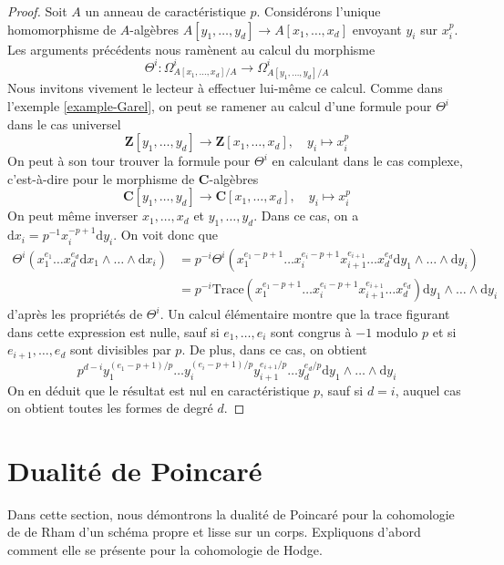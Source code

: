 \begin{proof}
\medskip\noindent
Soit $A$ un anneau de caractéristique $p$. Considérons l'unique homomorphisme de $A$-algèbres
$A[y_1, \ldots, y_d] \to A[x_1, \ldots, x_d]$
envoyant $y_i$ sur $x_i^p$. Les arguments précédents
nous ramènent au calcul du morphisme
$$
\Theta^i : \Omega^i_{A[x_1, \ldots, x_d]/A} \to
\Omega^i_{A[y_1, \ldots, y_d]/A}
$$
Nous invitons vivement le lecteur à effectuer lui-même ce calcul.
Comme dans l'exemple \ref{example-Garel}, on peut se ramener au calcul
d'une formule pour $\Theta^i$ dans le cas universel
$$
\mathbf{Z}[y_1, \ldots, y_d] \to \mathbf{Z}[x_1, \ldots, x_d],\quad
y_i \mapsto x_i^p
$$
On peut à son tour trouver la formule pour $\Theta^i$ en calculant dans le cas
complexe, c'est-à-dire pour le morphisme de $\mathbf{C}$-algèbres
$$
\mathbf{C}[y_1, \ldots, y_d] \to \mathbf{C}[x_1, \ldots, x_d],\quad
y_i \mapsto x_i^p
$$
On peut même inverser $x_1, \ldots, x_d$ et $y_1, \ldots, y_d$.
Dans ce cas, on a $\text{d}x_i = p^{-1} x_i^{- p + 1}\text{d}y_i$.
On voit donc que
\begin{align*}
\Theta^i(
x_1^{e_1} \ldots x_d^{e_d} \text{d}x_1 \wedge \ldots \wedge \text{d}x_i)
& =
p^{-i} \Theta^i(
x_1^{e_1 - p + 1} \ldots x_i^{e_i - p + 1} x_{i + 1}^{e_{i + 1}} \ldots
x_d^{e_d} \text{d}y_1 \wedge \ldots \wedge \text{d}y_i ) \\
& =
p^{-i} \text{Trace}(x_1^{e_1 - p + 1} \ldots x_i^{e_i - p + 1}
x_{i + 1}^{e_{i + 1}} \ldots x_d^{e_d})
\text{d}y_1 \wedge \ldots \wedge \text{d}y_i
\end{align*}
d'après les propriétés de $\Theta^i$. Un calcul élémentaire montre
que la trace figurant dans cette expression est nulle, sauf si
$e_1, \ldots, e_i$ sont congrus à $-1$ modulo $p$
et si $e_{i + 1}, \ldots, e_d$ sont divisibles par $p$.
De plus, dans ce cas, on obtient
$$
p^{d - i} y_1^{(e_1 - p + 1)/p} \ldots y_i^{(e_i - p + 1)/p}
y_{i + 1}^{e_{i + 1}/p} \ldots y_d^{e_d/p}
\text{d}y_1 \wedge \ldots \wedge \text{d}y_i
$$
On en déduit que le résultat est nul en caractéristique $p$, sauf si $d = i$,
auquel cas on obtient toutes les formes de degré $d$.
\end{proof}








\section{Dualité de Poincaré}
\label{section-poincare-duality}

\noindent
Dans cette section, nous démontrons la dualité de Poincaré pour la cohomologie de de Rham
d'un schéma propre et lisse sur un corps. Expliquons d'abord comment elle
se présente pour la cohomologie de Hodge.

